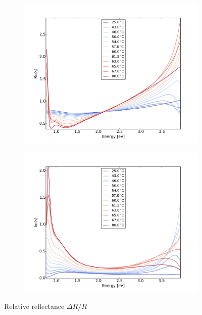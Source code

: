 \begin{figure}
    \begin{subfigure}[b]{0.49\textwidth}
        \centering
        \includegraphics[width=\textwidth]{Results/Sim4/re_gamma.pdf}
        \caption{}
        \label{fig:2}
    \end{subfigure}
    \begin{subfigure}[b]{0.49\textwidth}
        \centering
        \includegraphics[width=\textwidth]{Results/Sim4/im_gamma.pdf}
        \caption{}
        \label{fig:2}
    \end{subfigure}
    \caption{Relative reflectance $\Delta R/R$}
    \label{fig:}
\end{figure}
